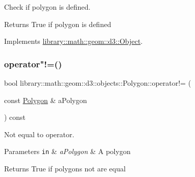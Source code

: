 Check if polygon is defined. 


\begin{DoxyCode}
\end{DoxyCode}


\begin{DoxyReturn}{Returns}
True if polygon is defined 
\end{DoxyReturn}


Implements \hyperlink{classlibrary_1_1math_1_1geom_1_1d3_1_1_object_a2216442e322f0c3ca5f01a4efa22baf7}{library\+::math\+::geom\+::d3\+::\+Object}.

\mbox{\label{classlibrary_1_1math_1_1geom_1_1d3_1_1objects_1_1_polygon_adaa065fdf80585b0d929151efe07212e}} 
\subsubsection{\texorpdfstring{operator"!=()}{operator!=()}}
{\footnotesize\ttfamily bool library\+::math\+::geom\+::d3\+::objects\+::\+Polygon\+::operator!= (\begin{DoxyParamCaption}\item[{const \hyperlink{classlibrary_1_1math_1_1geom_1_1d3_1_1objects_1_1_polygon}{Polygon} \&}]{a\+Polygon }\end{DoxyParamCaption}) const}



Not equal to operator. 


\begin{DoxyCode}
\end{DoxyCode}



\begin{DoxyParams}[1]{Parameters}
\mbox{\tt in}  & {\em a\+Polygon} & A polygon \\
\hline
\end{DoxyParams}
\begin{DoxyReturn}{Returns}
True if polygons not are equal 
\end{DoxyReturn}
\mbox{\label{classlibrary_1_1math_1_1geom_1_1d3_1_1objects_1_1_polygon_ac8aa92cf9ed3cbcd063df07ce3a89f60}} 
